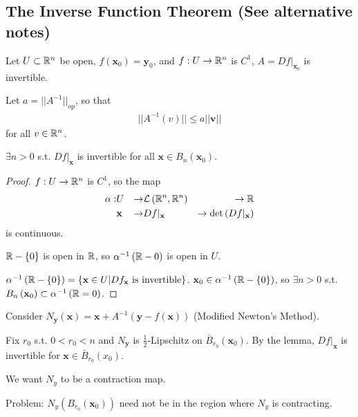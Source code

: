 \documentclass[a4paper]{article}
\begin{document}
\subsection{The Inverse Function Theorem (See alternative notes)}
Let $U \subset \mathbb{R}^n$ be open, $f\left(\mathbf{x}_0\right) = \mathbf{y}_0$, and $f:U \to \mathbb{R}^n$ is $C^1$, $A = Df|_{\mathbf{x}_0}$ is invertible.

Let $a = ||A^{-1}||_{op}$, so that
\begin{equation*}
\begin{aligned}
||A^{-1}\left(v\right)|| \leq a||\mathbf{v}||
\end{aligned}
\end{equation*}
for all $v \in \mathbb{R}^n$.

\begin{lemma}
$\exists n>0$ s.t. $Df|_\mathbf{x}$ is invertible for all $\mathbf{x} \in B_n \left(\mathbf{x}_0\right)$.
\begin{proof}
$f:U \to \mathbb{R}^n$ is $C^1$, so the map
\begin{equation*}
\begin{aligned}
\alpha: & U &\to& \mathcal{L}\left(\mathbb{R}^n,\mathbb{R}^n\right) &\to \mathbb{R}\\
&\mathbf{x} &\to& Df|_\mathbf{x} &\to \det\left(Df|_\mathbf{x}\right)
\end{aligned}
\end{equation*}
is continuous.

$\mathbb{R}-\left\{0\right\}$ is open in $\mathbb{R}$, so $\alpha^{-1} \left(\mathbb{R} - 0\right)$ is open in $U$.

$\alpha^{-1}\left(\mathbb{R}-\left\{0\right\}\right) = \left\{\mathbf{x} \in U | Df_\mathbf{x} \text{ is invertible}\right\}$. $\mathbf{x}_0 \in \alpha^{-1} \left(\mathbf{\mathbb{R}} - \left\{0\right\}\right)$, so $\exists n > 0$ s.t. $B_n\left(\mathbf{x}_0\right) \subset \alpha^{-1} \left(\mathbb{R} = 0\right)$.
\end{proof}
\end{lemma}

Consider $N_\mathbf{y}\left(\mathbf{x}\right) = \mathbf{x}+A^{-1}\left(\mathbf{y}-f\left(\mathbf{x}\right)\right)$ (Modified Newton's Method).

Fix $r_0$ s.t. $0<r_0<n$ and $N_\mathbf{y}$ is $\frac{1}{2}$-Lipschitz on $\bar{B}_{r_0}\left(\mathbf{x}_0\right)$. By the lemma, $Df|_\mathbf{x}$ is invertible for $\mathbf{x} \in \bar{B}_{r_0}\left(x_0\right)$.

We want $N_y$ to be a contraction map.

Problem: $N_y\left(B_{r_0}\left(\mathbf{x}_0\right)\right)$ need not be in the region where $N_y$ is contracting.
\end{document}
